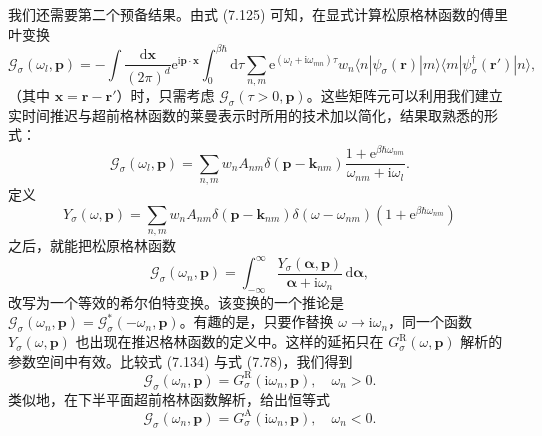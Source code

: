 我们还需要第二个预备结果。由式 (7.125) 可知，在显式计算松原格林函数的傅里叶变换
\begin{equation*}
\mathcal{G}_{\sigma}(\omega_{l},\mathbf{p}) = -\int\frac{\mathrm{d}\mathbf{x}}{(2\pi)^{d}}\mathrm{e}^{\mathrm{i}\mathbf{p}\cdot\mathbf{x}}\int_{0}^{\beta\hbar}\mathrm{d}\tau\sum_{n,m}\mathrm{e}^{(\omega_{l} + \mathrm{i}\omega_{mn})\tau}w_{n}\langle n|\psi_{\sigma}(\mathbf{r})|m\rangle\langle m|\psi^{\dagger}_{\sigma}(\mathbf{r}')|n\rangle,
\tag{7.131}
\end{equation*}
（其中 $\mathbf{x} = \mathbf{r} - \mathbf{r}'$）时，只需考虑 $\mathcal{G}_{\sigma}(\tau > 0,\mathbf{p})$。这些矩阵元可以利用我们建立实时间推迟与超前格林函数的莱曼表示时所用的技术加以简化，结果取熟悉的形式：
\begin{equation*}
\mathcal{G}_{\sigma}(\omega_{l},\mathbf{p}) = \sum_{n,m}w_{n}A_{nm}\delta(\mathbf{p} - \mathbf{k}_{nm})\frac{1 + \mathrm{e}^{\beta\hbar\omega_{nm}}}{\omega_{nm} + \mathrm{i}\omega_{l}}.
\tag{7.132}
\end{equation*}
定义
\begin{equation*}
Y_{\sigma}(\omega,\mathbf{p}) = \sum_{n,m}w_{n}A_{nm}\delta(\mathbf{p} - \mathbf{k}_{nm})\delta(\omega - \omega_{nm})\left(1 + \mathrm{e}^{\beta\hbar\omega_{nm}}\right)
\tag{7.133}
\end{equation*}
之后，就能把松原格林函数
\begin{equation*}
\mathcal{G}_{\sigma}(\omega_{n},\mathbf{p}) = \int_{-\infty}^{\infty}\frac{Y_{\sigma}(\boldsymbol{\alpha},\mathbf{p})}{\boldsymbol{\alpha} + \mathrm{i}\omega_{n}}\,\mathrm{d}\boldsymbol{\alpha},
\tag{7.134}
\end{equation*}
改写为一个等效的希尔伯特变换。该变换的一个推论是 $\mathcal{G}_{\sigma}(\omega_{n},\mathbf{p}) = \mathcal{G}^{*}_{\sigma}(-\omega_{n},\mathbf{p})$。有趣的是，只要作替换 $\omega \to \mathrm{i}\omega_{n}$，同一个函数 $Y_{\sigma}(\omega,\mathbf{p})$ 也出现在推迟格林函数的定义中。这样的延拓只在 $G^{\mathrm{R}}_{\sigma}(\omega,\mathbf{p})$ 解析的参数空间中有效。比较式 (7.134) 与式 (7.78)，我们得到
\begin{equation*}
\mathcal{G}_{\sigma}(\omega_{n},\mathbf{p}) = G^{\mathrm{R}}_{\sigma}(\mathrm{i}\omega_{n},\mathbf{p}), \quad \omega_{n} > 0.
\tag{7.135}
\end{equation*}
类似地，在下半平面超前格林函数解析，给出恒等式
\begin{equation*}
\mathcal{G}_{\sigma}(\omega_{n},\mathbf{p}) = G^{\mathrm{A}}_{\sigma}(\mathrm{i}\omega_{n},\mathbf{p}), \quad \omega_{n} < 0.
\tag{7.136}
\end{equation*}

